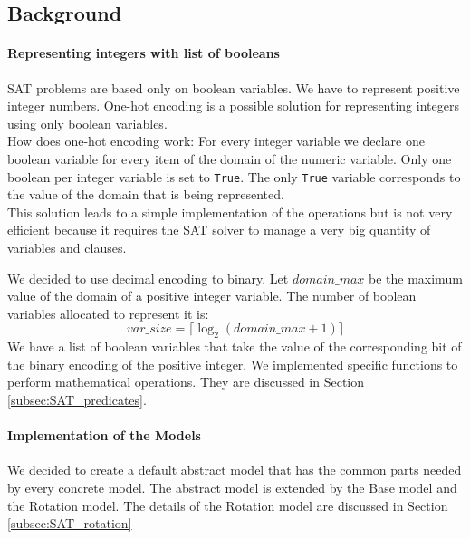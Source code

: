 \subsection{Background}\label{subsec:SAT_background}

  \paragraph*{Representing integers with list of booleans}
    SAT problems are based only on boolean variables. We have to represent positive integer numbers. 
    One-hot encoding is a possible solution for representing integers using only boolean variables.\\
    How does one-hot encoding work:
    For every integer variable we declare one boolean variable for every item of the domain of 
    the numeric variable. Only one boolean per integer variable is set to \texttt{True}. The only \texttt{True} 
    variable corresponds to the value of the domain that is being represented.\\

    This solution leads to a simple implementation of the operations but is not very efficient 
    because it requires the SAT solver to manage a very big quantity of variables and clauses.

    We decided to use decimal encoding to binary. Let \(domain\_max\) be the maximum value of the domain of 
    a positive integer variable. The number of boolean variables allocated to represent it is:
    \begin{equation*}
        var\_size = \lceil \log_2 (domain\_max + 1)\rceil
    \end{equation*}
    We have a list of boolean variables that take the value of the corresponding bit of the binary encoding
    of the positive integer. We implemented specific functions to perform mathematical operations.
    They are discussed in Section \ref{subsec:SAT_predicates}. \\

  \paragraph*{Implementation of the Models}
    We decided to create a default abstract model that has the common parts needed by
    every concrete model. The abstract model is extended by the Base model and the Rotation model. 
    The details of the Rotation model are discussed in Section \ref{subsec:SAT_rotation}\\

